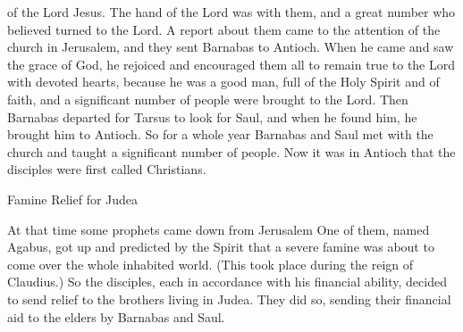 {of the Lord
Jesus.
The
hand
of the Lord
was
with
them,
and
a
great
number
who believed
turned
to
the Lord.
A report
about
them
came
to
the attention
of the church
in
Jerusalem,
and
they sent
Barnabas
to
Antioch.
When
he came
and
saw
the grace
of God,
he rejoiced
and
encouraged
them all
to remain true
to
the Lord
with devoted
hearts,
because
he was
a
good
man,
full
of
the Holy
Spirit
and
of faith,
and
a significant number
of people
were brought
to the Lord.
Then Barnabas departed
for
Tarsus
to look for
Saul,
and
when
he found
him, he brought
him to
Antioch.
So
for a whole
year
Barnabas and Saul met
with
the church
and
taught
a significant number
of people.
Now it was in
Antioch
that the disciples
were
first
called
Christians.
\par }{\SH Famine Relief for Judea
\par }{\PP {}At
that
time
some prophets
came down
from
Jerusalem
One
of
them,
named
Agabus,
got up
and predicted
by
the Spirit
that a
severe
famine
was about
to come
over
the whole
inhabited world.
(This took place
during the reign of Claudius.)
So
the disciples,
each
in accordance with
his financial ability,
decided
to send
relief
to the brothers
living
in
Judea.
They did
so, sending
their financial aid to
the elders
by
Barnabas
and
Saul.

}

